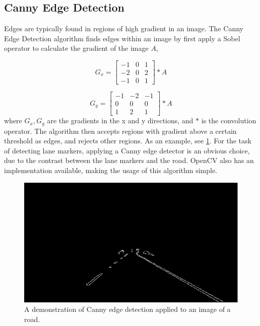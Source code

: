 \documentclass[conf]{new-aiaa}
\begin{document}
\subsection{Canny Edge Detection}
Edges are typically found in regions of high gradient in an image.  The Canny Edge Detection algorithm finds edges within an image by first apply a Sobel operator to calculate the gradient of the image $A$,

\begin{equation}
    G_{x} = \begin{bmatrix}
            -1 & 0 & 1 \\
            -2 & 0 & 2 \\
            -1 & 0 & 1
    \end{bmatrix}
    * A
\end{equation}

\begin{equation}
    G_{y} = \begin{bmatrix}
            -1 & -2 & -1 \\
            0 & 0 & 0 \\
            1 & 2 & 1
    \end{bmatrix}
    * A
\end{equation}
where $G_{x}, G_{y}$ are the gradients in the x and y directions, and $*$ is the convolution operator.  The algorithm then accepts regions with gradient above a certain threshold as edges, and rejects other regions.  As an example, see \ref{fig:cv_canny}.  For the task of detecting lane markers, applying a Canny edge detector is an obvious choice, due to the contrast between the lane markers and the road.  OpenCV also has an implementation available, making the usage of this algorithm simple.
\begin{figure}[h!]
    \centering
    \includegraphics[scale = 0.75]{"./images/cv_canny"}
    \caption{A demonstration of Canny edge detection applied to an image of a road.}
    \label{fig:cv_canny}
\end{figure}
\end{document}
